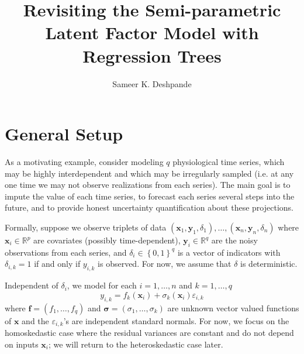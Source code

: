 \documentclass[12pt]{article}
\title{Revisiting the Semi-parametric Latent Factor Model with Regression Trees}
\author{Sameer K. Deshpande}
\begin{document}
\maketitle
\def\C{\mathbb{C}}
\def\R{\mathbb{R}}
\def\Q{\mathbb{Q}}
\def\Z{\mathbb{Z}}
\def\N{\text{N}}
\def\P{\mathbb{P}}
\def\E{\mathbb{E}}
\def\by{\mathbf{y}}
\def\bx{\mathbf{x}}
\def\bz{\mathbf{z}}
\def\bw{\mathbf{w}}
\def\br{\mathbf{r}}
\def\bu{\mathbf{u}}
\def\bY{\mathbf{Y}}
\def\bX{\mathbf{X}}
\def\bf{\mathbf{f}}
\def\bgamma{\boldsymbol{\gamma}}
\def\bSigma{\boldsymbol{\Sigma}}
\def\bsigma{\boldsymbol{\sigma}}
\def\bmu{\boldsymbol{\mu}}

\def\M{\mathcal{M}}
\def\T{\mathcal{T}}
\def\tilT{\tilde{T}}


\section{General Setup}
\label{sec:introduction}


As a motivating example, consider modeling $q$ physiological time series, which may be highly interdependent and which may be irregularly sampled (i.e. at any one time we may not observe realizations from each series).
The main goal is to impute the value of each time series, to forecast each series several steps into the future, and to provide honest uncertainty quantification about these projections.

Formally, suppose we observe triplets of data $(\bx_{1}, \by_{1}, \delta_{1}), \ldots, (\bx_{n}, \by_{n}, \delta_{n})$ where $\bx_{i} \in \R^{p}$ are covariates (possibly time-dependent), $\by_{i} \in \R^{q}$ are the noisy observations from each series, and $\delta_{i} \in \left\{0,1\right\}^{q}$ is a vector of indicators with $\delta_{i,k} = 1$ if and only if $y_{i,k}$ is observed.
For now, we assume that $\delta$ is deterministic.

Independent of $\delta_{i}$, we model for each $i = 1, \ldots, n$ and $k = 1, \ldots, q$ 
$$
y_{i,k} = f_{k}(\bx_{i}) + \sigma_{k}(\bx_{i})\varepsilon_{i,k}
$$
where $\bf = (f_{1}, \ldots, f_{q})$ and $\bsigma = (\sigma_{1}, \ldots, \sigma_{k})$ are unknown vector valued functions of $\bx$ and the $\varepsilon_{i,k}$'s are independent standard normals.
For now, we focus on the homoskedastic case where the residual variances are constant and do not depend on inputs $\bx_{i}$; we will return to the heteroskedastic case later.
\end{document}
